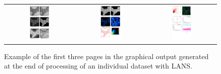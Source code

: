 \begin{figure}[!ht]
\centering
\begin{tabular}{ccc}
\includegraphics[width=0.31\textwidth, valign=t]{figs3/outputG1}
&
\includegraphics[width=0.31\textwidth, valign=t]{figs3/outputG2}
&
\includegraphics[width=0.31\textwidth, valign=t]{figs3/outputG3}
\end{tabular}
\caption{\label{fig:outputG}%
Example of the first three pages in the graphical output generated at the end of processing of an individual dataset with LANS.}
\end{figure}

